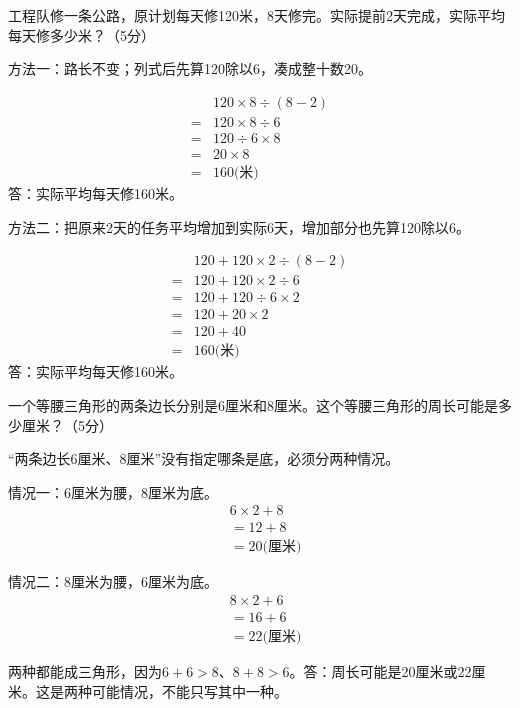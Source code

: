 工程队修一条公路，原计划每天修120米，8天修完。实际提前2天完成，实际平均每天修多少米？（5分）\par
\begin{BookAnswer}
方法一：路长不变；列式后先算120除以6，凑成整十数20。\par \[\begin{aligned}&120\times8\div(8-2)\\={}&120\times8\div6\\={}&120\div6\times8\\={}&20\times8\\={}&160\text{(米)}\end{aligned}\]答：实际平均每天修160米。\par 方法二：把原来2天的任务平均增加到实际6天，增加部分也先算120除以6。\par \[\begin{aligned}&120+120\times2\div(8-2)\\={}&120+120\times2\div6\\={}&120+120\div6\times2\\={}&120+20\times2\\={}&120+40\\={}&160\text{(米)}\end{aligned}\]答：实际平均每天修160米。
\end{BookAnswer}

一个等腰三角形的两条边长分别是6厘米和8厘米。这个等腰三角形的周长可能是多少厘米？（5分）\par
\begin{BookAnswer}
“两条边长6厘米、8厘米”没有指定哪条是底，必须分两种情况。\par 情况一：6厘米为腰，8厘米为底。\[\begin{aligned}&6\times2+8\\&=12+8\\&=20\text{(厘米)}\end{aligned}\]\par 情况二：8厘米为腰，6厘米为底。\[\begin{aligned}&8\times2+6\\&=16+6\\&=22\text{(厘米)}\end{aligned}\]\par 两种都能成三角形，因为\(6+6>8\)、\(8+8>6\)。答：周长可能是20厘米或22厘米。这是两种可能情况，不能只写其中一种。
\end{BookAnswer}


